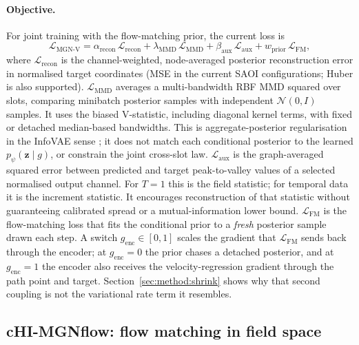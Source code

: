 \paragraph{Objective.}
For joint training with the flow-matching prior, the current loss is
\begin{equation}
  \mathcal{L}_{\text{MGN-V}}
  = \alpha_{\mathrm{recon}}\,\mathcal{L}_{\mathrm{recon}}
  + \lambda_{\mathrm{MMD}}\,\mathcal{L}_{\mathrm{MMD}}
  + \beta_{\mathrm{aux}}\,\mathcal{L}_{\mathrm{aux}}
  + w_{\mathrm{prior}}\,\mathcal{L}_{\mathrm{FM}},
  \label{eq:mgnv-loss}
\end{equation}
where $\mathcal{L}_{\mathrm{recon}}$ is the channel-weighted, node-averaged
posterior reconstruction error in normalised target coordinates (MSE in the
current SAOI configurations; Huber is also supported).
$\mathcal{L}_{\mathrm{MMD}}$ averages a multi-bandwidth RBF MMD squared over
slots, comparing minibatch posterior samples with independent
$\mathcal{N}(0,I)$ samples. It uses the biased V-statistic, including diagonal
kernel terms, with fixed or detached median-based bandwidths. This is
aggregate-posterior regularisation in the InfoVAE sense
\citep{zhao2017infovae}; it does not match each conditional posterior to the
learned $p_\psi(\mathbf{z}\mid g)$, or constrain the joint cross-slot law.
$\mathcal{L}_{\mathrm{aux}}$ is the graph-averaged squared error between
predicted and target peak-to-valley values of a selected normalised output
channel. For $T=1$ this is the field statistic; for temporal data it is the
increment statistic. It encourages reconstruction of that statistic without
guaranteeing calibrated spread or a mutual-information lower bound.
$\mathcal{L}_{\mathrm{FM}}$ is the flow-matching
loss that fits the conditional prior to a \emph{fresh} posterior sample drawn
each step. A switch $g_{\mathrm{enc}}\in[0,1]$ scales the gradient that
$\mathcal{L}_{\mathrm{FM}}$ sends back through the encoder; at
$g_{\mathrm{enc}}=0$ the prior chases a detached posterior, and at
$g_{\mathrm{enc}}=1$ the encoder also receives the velocity-regression
gradient through the path point and target.
Section~\ref{sec:method:shrink} shows why that second coupling is not the
variational rate term it resembles.

\subsection{cHI-MGNflow: flow matching in field space}
\label{sec:method:flow}

